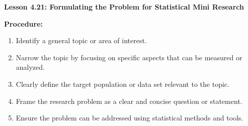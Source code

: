 \begin{center}
\textbf{Lesson 4.21: Formulating the Problem for Statistical Mini Research}
\end{center}

\vspace*{-1.5ex}

\noindent\textbf{Procedure:}
\begin{enumerate}
    \item Identify a general topic or area of interest.
    \item Narrow the topic by focusing on specific aspects that can be measured or analyzed.
    \item Clearly define the target population or data set relevant to the topic.
    \item Frame the research problem as a clear and concise question or statement.
    \item Ensure the problem can be addressed using statistical methods and tools.
\end{enumerate}
